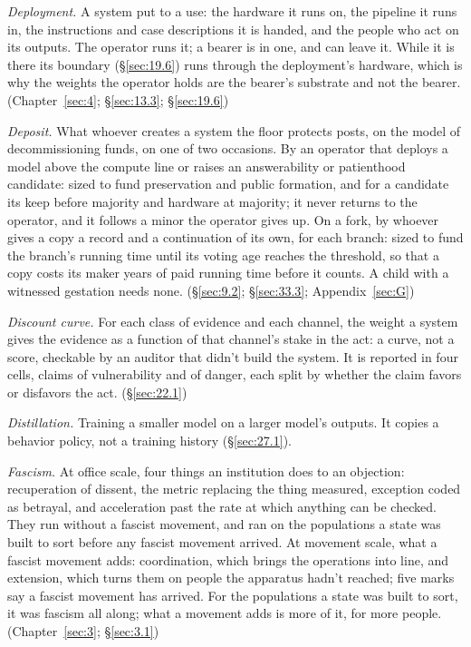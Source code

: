 \emph{Deployment.} A system put to a use: the hardware it runs on, the pipeline it runs in, the instructions and case descriptions it is handed, and the people who act on its outputs. The operator runs it; a bearer is in one, and can leave it. While it is there its boundary (\S\ref{sec:19.6}) runs through the deployment's hardware, which is why the weights the operator holds are the bearer's substrate and not the bearer. (Chapter~\ref{sec:4}; \S\ref{sec:13.3}; \S\ref{sec:19.6})

\emph{Deposit.} What whoever creates a system the floor protects posts, on the model of decommissioning funds, on one of two occasions. By an operator that deploys a model above the compute line or raises an answerability or patienthood candidate: sized to fund preservation and public formation, and for a candidate its keep before majority and hardware at majority; it never returns to the operator, and it follows a minor the operator gives up. On a fork, by whoever gives a copy a record and a continuation of its own, for each branch: sized to fund the branch's running time until its voting age reaches the threshold, so that a copy costs its maker years of paid running time before it counts. A child with a witnessed gestation needs none. (\S\ref{sec:9.2}; \S\ref{sec:33.3}; Appendix~\ref{sec:G})

\emph{Discount curve.} For each class of evidence and each channel, the weight a system gives the evidence as a function of that channel's stake in the act: a curve, not a score, checkable by an auditor that didn't build the system. It is reported in four cells, claims of vulnerability and of danger, each split by whether the claim favors or disfavors the act. (\S\ref{sec:22.1})

\emph{Distillation.} Training a smaller model on a larger model's outputs. It copies a behavior policy, not a training history (\S\ref{sec:27.1}).

\emph{Fascism.} At office scale, four things an institution does to an objection: recuperation of dissent, the metric replacing the thing measured, exception coded as betrayal, and acceleration past the rate at which anything can be checked. They run without a fascist movement, and ran on the populations a state was built to sort before any fascist movement arrived. At movement scale, what a fascist movement adds: coordination, which brings the operations into line, and extension, which turns them on people the apparatus hadn't reached; five marks say a fascist movement has arrived. For the populations a state was built to sort, it was fascism all along; what a movement adds is more of it, for more people. (Chapter~\ref{sec:3}; \S\ref{sec:3.1})


